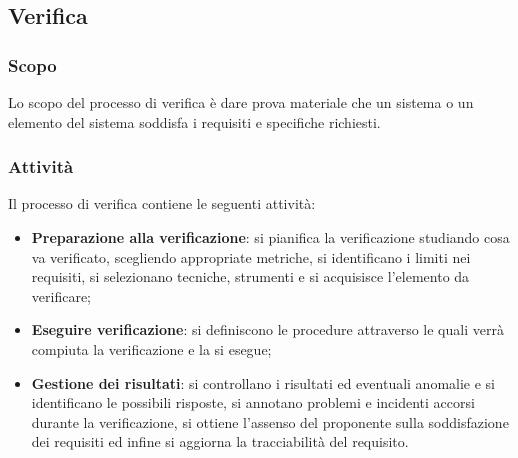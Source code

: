 	
	\subsection{Verifica}
	\subsubsection{Scopo}
	Lo scopo del processo di verifica è dare prova materiale che un sistema o un elemento del sistema soddisfa i requisiti e specifiche richiesti.
	\subsubsection{Attività}
	Il processo di verifica contiene le seguenti attività:
	\begin{itemize}
	    \item \textbf{Preparazione alla verificazione}: si pianifica la verificazione studiando cosa va verificato, scegliendo appropriate metriche, si identificano i limiti nei requisiti, si selezionano tecniche, strumenti e si acquisisce l'elemento da verificare;
	    \item \textbf{Eseguire verificazione}: si definiscono le procedure attraverso le quali verrà compiuta la verificazione e la si esegue;
	    \item \textbf{Gestione dei risultati}: si controllano i risultati ed eventuali anomalie e si identificano le possibili risposte, si annotano problemi e incidenti accorsi durante la verificazione, si ottiene l'assenso del proponente sulla soddisfazione dei requisiti ed infine si aggiorna la tracciabilità del requisito.
	\end{itemize}
